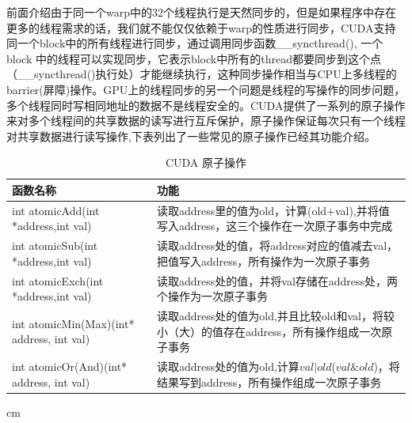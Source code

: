 前面介绍由于同一个warp中的32个线程执行是天然同步的，但是如果程序中存在更多的线程需求的话，我们就不能仅仅依赖于warp的性质进行同步，CUDA支持同一个block中的所有线程进行同步，通过调用同步函数\_\_syncthread(), 一个block 中的线程可以实现同步，它表示block中所有的thread都要同步到这个点（\_\_syncthread()执行处）才能继续执行，这种同步操作相当与CPU上多线程的barrier(屏障)操作。GPU上的线程同步的另一个问题是线程的写操作的同步问题，多个线程同时写相同地址的数据不是线程安全的。CUDA提供了一系列的原子操作来对多个线程间的共享数据的读写进行互斥保护，原子操作保证每次只有一个线程对共享数据进行读写操作,下表列出了一些常见的原子操作已经其功能介绍。
\begin{table}[t]
\newcommand{\tabincell}[2]{\begin{tabular}{@{}#1@{}}#2\end{tabular}}
\setlength{\abovecaptionskip}{0.2cm}
\scriptsize{
\caption{CUDA 原子操作}
\renewcommand{\tabcolsep}{0.09cm}
\renewcommand{\arraystretch}{0.8}
\centering
\begin{tabular}{|p{6cm}<{\centering}|p{6cm}<{\centering}|}
\hline 函数名称& 功能\\ \hline
int atomicAdd(int *address,int val)&读取address里的值为old，计算(old+val),并将值写入address，这三个操作在一次原子事务中完成\\ \hline
int atomicSub(int *address,int val)&读取address处的值，将address对应的值减去val，把值写入address，所有操作为一次原子事务\\ \hline
int atomicExch(int *address,int val)&读取address处的值，并将val存储在address处，两个操作为一次原子事务\\ \hline
int atomicMin(Max)(int* address, int val)&读取address处的值为old,并且比较old和val，将较小（大）的值存在address，所有操作组成一次原子事务\\ \hline
int atomicOr(And)(int* address, int val)&读取address处的值为old,计算$val|old$($val \& old$)，将结果写到address，所有操作组成一次原子事务\\ \hline
\end{tabular}
 cm
\label{CY}
}
\end{table}
